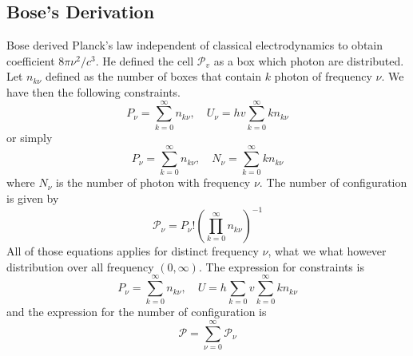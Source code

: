 \documentclass[../../../Main.tex]{subfiles}
\begin{document}
\subsection*{Bose's Derivation}
Bose derived Planck's law independent of classical electrodynamics to obtain coefficient $8\pi \nu^2/c^3$. He defined the cell $\mathcal{P}_v$ as a box which photon are distributed. Let $n_{k\nu}$ defined as the number of boxes that contain $k$ photon of frequency $\nu$. We have then the following constraints.
\begin{equation*}
    P_\nu=\sum_{k=0}^{\infty}n_{k\nu},\quad U_\nu= hv\sum_{k=0}^{\infty}kn_{k\nu}
\end{equation*}
or simply
\begin{equation*}
    P_\nu=\sum_{k=0}^{\infty}n_{k\nu},\quad N_\nu= \sum_{k=0}^{\infty} kn_{k\nu}
\end{equation*}
where $N_\nu$ is the number of photon with frequency $\nu$. The number of configuration is given by 
\begin{equation*}
    \mathcal{P}_\nu=P_\nu!\left(\prod_{k=0}^{\infty}n_{k\nu}\right)^{-1}
\end{equation*}  
All of those equations applies for distinct frequency $\nu$, what we what however distribution over all frequency $(0,\infty)$. The expression for constraints is
\begin{equation*}
    P_\nu=\sum_{k=0}^{\infty}n_{k\nu},\quad U= h\sum_{k=0}v\sum_{k=0}^{\infty}kn_{k\nu}
\end{equation*}
and the expression for the number of configuration is 
\begin{equation*}
    \mathcal{P}=\sum_{\nu=0}^{\infty}\mathcal{P}_\nu
\end{equation*} 
\end{document}
